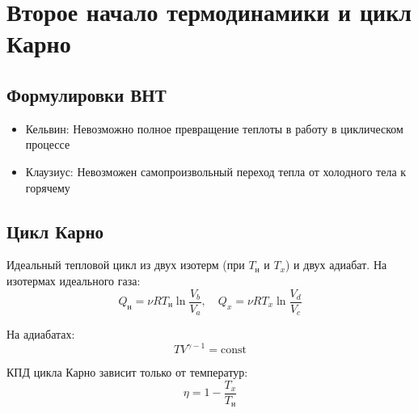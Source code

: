 \documentclass{article}
\begin{document}
\section*{Второе начало термодинамики и цикл Карно}

\subsection*{Формулировки ВНТ}
\begin{itemize}
\item Кельвин: Невозможно полное превращение теплоты в работу в циклическом процессе
\item Клаузиус: Невозможен самопроизвольный переход тепла от холодного тела к горячему
\end{itemize}

\subsection*{Цикл Карно}
Идеальный тепловой цикл из двух изотерм (при $T_н$ и $T_x$) и двух адиабат. На изотермах идеального газа:
\[
Q_{\text{н}}= \nu R T_{\text{н}}\ln\frac{V_b}{V_a}, \quad
Q_x= \nu R T_x\ln\frac{V_d}{V_c}
\]

На адиабатах:
\[
T V^{\gamma-1}=\text{const}
\]

КПД цикла Карно зависит только от температур:
\[
\eta=1-\frac{T_x}{T_{\text{н}}}
\]
\end{document}
